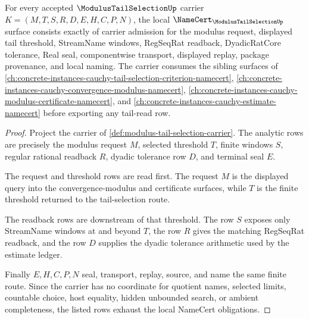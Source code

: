 \begin{theorem}
\label{thm:modulus-tail-selection-namecert-obligations}
For every accepted $\ModulusTailSelectionUp$ carrier $K=(M,T,S,R,D,E,H,C,P,N)$, the local $\NameCert_{\ModulusTailSelectionUp}$ surface consists exactly of carrier admission for the modulus request, displayed tail threshold, StreamName windows, RegSeqRat readback, DyadicRatCore tolerance, Real seal, componentwise transport, displayed replay, package provenance, and local naming. The carrier consumes the sibling surfaces of \autoref{ch:concrete-instances-cauchy-tail-selection-criterion-namecert}, \autoref{ch:concrete-instances-cauchy-convergence-modulus-namecert}, \autoref{ch:concrete-instances-cauchy-modulus-certificate-namecert}, and \autoref{ch:concrete-instances-cauchy-estimate-namecert} before exporting any tail-read row.
\end{theorem}
\begin{proof}
Project the carrier of \autoref{def:modulus-tail-selection-carrier}. The analytic rows are precisely the modulus request $M$, selected threshold $T$, finite windows $S$, regular rational readback $R$, dyadic tolerance row $D$, and terminal seal $E$.

The request and threshold rows are read first. The request $M$ is the displayed query into the convergence-modulus and certificate surfaces, while $T$ is the finite threshold returned to the tail-selection route.

The readback rows are downstream of that threshold. The row $S$ exposes only StreamName windows at and beyond $T$, the row $R$ gives the matching RegSeqRat readback, and the row $D$ supplies the dyadic tolerance arithmetic used by the estimate ledger.

Finally $E,H,C,P,N$ seal, transport, replay, source, and name the same finite route. Since the carrier has no coordinate for quotient names, selected limits, countable choice, host equality, hidden unbounded search, or ambient completeness, the listed rows exhaust the local NameCert obligations.
\end{proof}

